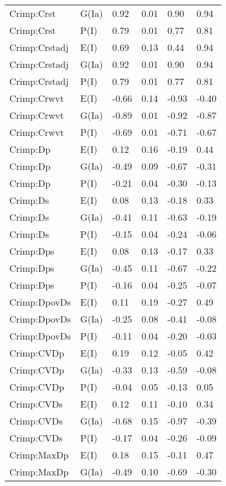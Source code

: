 \begin{center}
\begin{longtable}{|p{1.1in}|p{0.7in}|p{0.7in}|p{0.6in}|p{0.6in}|p{0.6in}|}
  Crimp:Crst & G(Ia) & 0.92 & 0.01 & 0.90 & 0.94 \\ 
  Crimp:Crst & P(I) & 0.79 & 0.01 & 0.77 & 0.81 \\ 
  Crimp:Crstadj & E(I) & 0.69 & 0.13 & 0.44 & 0.94 \\ 
  Crimp:Crstadj & G(Ia) & 0.92 & 0.01 & 0.90 & 0.94 \\ 
  Crimp:Crstadj & P(I) & 0.79 & 0.01 & 0.77 & 0.81 \\ 
  Crimp:Crwvt & E(I) & -0.66 & 0.14 & -0.93 & -0.40 \\ 
  Crimp:Crwvt & G(Ia) & -0.89 & 0.01 & -0.92 & -0.87 \\ 
  Crimp:Crwvt & P(I) & -0.69 & 0.01 & -0.71 & -0.67 \\ 
  Crimp:Dp & E(I) & 0.12 & 0.16 & -0.19 & 0.44 \\ 
  Crimp:Dp & G(Ia) & -0.49 & 0.09 & -0.67 & -0.31 \\ 
  Crimp:Dp & P(I) & -0.21 & 0.04 & -0.30 & -0.13 \\ 
  Crimp:Ds & E(I) & 0.08 & 0.13 & -0.18 & 0.33 \\ 
  Crimp:Ds & G(Ia) & -0.41 & 0.11 & -0.63 & -0.19 \\ 
  Crimp:Ds & P(I) & -0.15 & 0.04 & -0.24 & -0.06 \\ 
  Crimp:Dps & E(I) & 0.08 & 0.13 & -0.17 & 0.33 \\ 
  Crimp:Dps & G(Ia) & -0.45 & 0.11 & -0.67 & -0.22 \\ 
  Crimp:Dps & P(I) & -0.16 & 0.04 & -0.25 & -0.07 \\ 
  Crimp:DpovDs & E(I) & 0.11 & 0.19 & -0.27 & 0.49 \\ 
  Crimp:DpovDs & G(Ia) & -0.25 & 0.08 & -0.41 & -0.08 \\ 
  Crimp:DpovDs & P(I) & -0.11 & 0.04 & -0.20 & -0.03 \\ 
  Crimp:CVDp & E(I) & 0.19 & 0.12 & -0.05 & 0.42 \\ 
  Crimp:CVDp & G(Ia) & -0.33 & 0.13 & -0.59 & -0.08 \\ 
  Crimp:CVDp & P(I) & -0.04 & 0.05 & -0.13 & 0.05 \\ 
  Crimp:CVDs & E(I) & 0.12 & 0.11 & -0.10 & 0.34 \\ 
  Crimp:CVDs & G(Ia) & -0.68 & 0.15 & -0.97 & -0.39 \\ 
  Crimp:CVDs & P(I) & -0.17 & 0.04 & -0.26 & -0.09 \\ 
  Crimp:MaxDp & E(I) & 0.18 & 0.15 & -0.11 & 0.47 \\ 
  Crimp:MaxDp & G(Ia) & -0.49 & 0.10 & -0.69 & -0.30 \\ 

\end{longtable}
\end{center}
